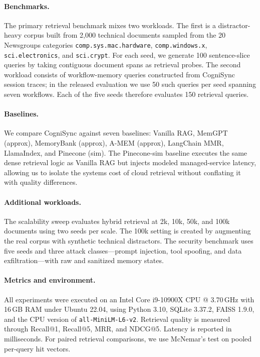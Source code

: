\documentclass{article}
\begin{document}
\paragraph{Benchmarks.}
The primary retrieval benchmark mixes two workloads. The first is a distractor-heavy corpus built from 2,000 technical documents sampled from the 20 Newsgroups categories \texttt{comp.sys.mac.hardware}, \texttt{comp.windows.x}, \texttt{sci.electronics}, and \texttt{sci.crypt}. For each seed, we generate 100 sentence-slice queries by taking contiguous document spans as retrieval probes. The second workload consists of workflow-memory queries constructed from CogniSync session traces; in the released evaluation we use 50 such queries per seed spanning seven workflows. Each of the five seeds therefore evaluates 150 retrieval queries.

\paragraph{Baselines.}
We compare CogniSync against seven baselines: Vanilla RAG, MemGPT (approx), MemoryBank (approx), A-MEM (approx), LangChain MMR, LlamaIndex, and Pinecone (sim). The Pinecone-sim baseline executes the same dense retrieval logic as Vanilla RAG but injects modeled managed-service latency, allowing us to isolate the systems cost of cloud retrieval without conflating it with quality differences.

\paragraph{Additional workloads.}
The scalability sweep evaluates hybrid retrieval at 2k, 10k, 50k, and 100k documents using two seeds per scale. The 100k setting is created by augmenting the real corpus with synthetic technical distractors. The security benchmark uses five seeds and three attack classes---prompt injection, tool spoofing, and data exfiltration---with raw and sanitized memory states.

\paragraph{Metrics and environment.}
All experiments were executed on an Intel Core i9-10900X CPU @ 3.70\,GHz with 16\,GB RAM under Ubuntu 22.04, using Python 3.10, SQLite 3.37.2, FAISS 1.9.0, and the CPU version of \texttt{all-MiniLM-L6-v2}. Retrieval quality is measured through Recall@1, Recall@5, MRR, and NDCG@5. Latency is reported in milliseconds. For paired retrieval comparisons, we use McNemar's test on pooled per-query hit vectors.
\end{document}

